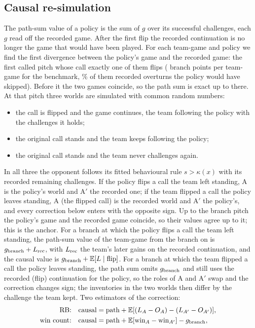 \documentclass[aoas]{imsart}
\theoremstyle{plain}
\theoremstyle{definition}
\newcommand{\E}{\mathbb{E}}
\begin{document}
\subsection{Causal re-simulation}\label{sec:causal}
The path-sum value of a policy is the sum of $g$ over its successful challenges, each $g$ read off the recorded game.
After the first flip the recorded continuation is no longer the game that would have been played. For each team-game and policy we find the first divergence between the policy's game and the recorded
game: the first called pitch whose call exactly one of them flips (\SBranches{} branch points per team-game for the
benchmark, \CausalSkipShare\% of them recorded overturns the policy would have skipped). Before it the two games
coincide, so the path sum is exact up to there. At that pitch three worlds are simulated with common random numbers:
\begin{itemize}
\item[A:] the call is flipped and the game continues, the team following the policy with the challenges it holds;
\item[A$'$:] the original call stands and the team keeps following the policy;
\item[B:] the original call stands and the team never challenges again.
\end{itemize}
In all three the opponent follows its fitted behavioural rule $s>\kappa(x)$ with its recorded remaining challenges.
If the policy flips a call the team left standing, A is the policy's world and A$'$ the recorded one; if the team
flipped a call the policy leaves standing, A (the flipped call) is the recorded world and A$'$ the policy's, and every
correction below enters with the opposite sign.
Up to the branch pitch the policy's game and the recorded game coincide, so their values agree up to it; this is the
anchor. For a branch at which the policy flips a call the team left standing, the path-sum value of the team-game from
the branch on is $g_{\rm branch}+L_{\rm rec}$, with $L_{\rm rec}$ the team's later gains on the recorded continuation,
and the causal value is $g_{\rm branch}+\E[L\mid\text{flip}]$. For a branch at which the team flipped a call the policy
leaves standing, the path sum omits $g_{\rm branch}$ and still uses the recorded (flip) continuation for the policy, so
the roles of A and A$'$ swap and the correction changes sign; the inventories in the two worlds then differ by the
challenge the team kept. Two estimators of the correction:
\begin{align*}
\text{RB:}\quad & \text{causal}=\text{path}+\E[(L_A-O_A)-(L_{A'}-O_{A'})], \\
\text{win count:}\quad & \text{causal}=\text{path}+\E[\text{win}_A-\text{win}_{A'}]-g_{\rm branch},
\end{align*}
\end{document}
